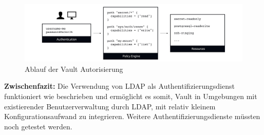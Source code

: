 \documentclass[
book,
a4paper,   
titlepage,  
halfparskip,
12pt        
]{scrartcl}
\begin{document}
\begin{onehalfspacing}
\begin{figure}[h]
	\centering
	\includegraphics[width=1\linewidth]{vaultauth.jpg}
	\caption[Vault Autorisierung]{Ablauf der Vault Autorisierung \cite{vaultauth2}}
	\label{fig:vaultauth}
\end{figure}

\textbf{Zwischenfazit:} Die Verwendung von LDAP als Authentifizierungsdienst funktioniert wie beschrieben und ermöglicht es somit, Vault in Umgebungen mit existierender Benutzerverwaltung durch LDAP, mit relativ kleinem Konfigurationsaufwand zu integrieren. Weitere Authentifizierungsdienste müssten noch getestet werden.


\end{onehalfspacing}
\end{document}
